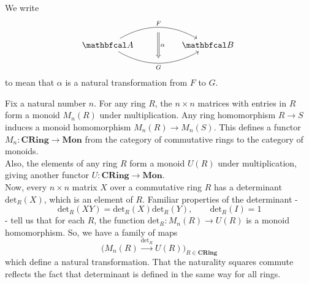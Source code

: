We write
\begin{equation*}
\begin{tikzcd}
    \cat{A} \arrow[rr, bend left=30, "F"{name=F}]
    \arrow[rr, bend right=30, "G"'{name=G}]
    && \cat{B} \
    \arrow[from=F, Rightarrow, to=G, "\alpha", shorten <= 6pt, shorten >= 6pt]
\end{tikzcd}
\end{equation*}
to mean that $\alpha$ is a natural transformation from $F$ to $G$.

\begin{example}
    Fix a natural number $n$. For any ring $R$, the $n\times n$ matrices with entries in $R$ form a monoid $M_n(R)$ under multiplication. Any ring homomorphism $R\to S$ induces a monoid homomorphism $M_n(R)\to M_n(S)$. This defines a functor $M_n: \textbf{CRing} \to \textbf{Mon}$ from the category of commutative rings to the category of monoids.\\
    Also, the elements of any ring $R$ form a monoid $U(R)$ under multiplication, giving another functor $U: \textbf{CRing}\to \textbf{Mon}$.\\
    Now, every $n\times n$ matrix $X$ over a commutative ring $R$ has a determinant $\text{det}_R(X)$, which is an element of $R$. Familiar properties of the determinant -
    \begin{equation*}
        \text{det}_R(XY)=\text{det}_R(X)\text{det}_R(Y),\qquad \text{det}_R(I)=1
    \end{equation*}
    - tell us that for each $R$, the function $\text{det}_R:M_n(R)\to U(R)$ is a monoid homomorphism. So, we have a family of maps
    $$\big(M_n(R) \xrightarrow{\text{det}_R} U(R)\big)_{R\in \textbf{CRing}}$$
    which define a natural transformation. That the naturality squares commute reflects the fact that determinant is defined in the same way for all rings.
\end{example}


